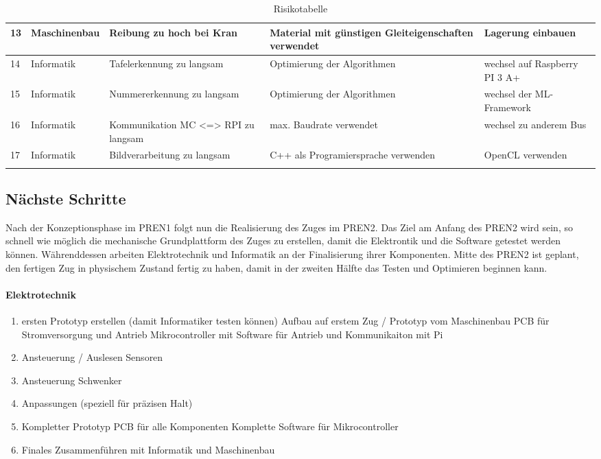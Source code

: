\documentclass[../../main.tex]{subfiles}
\begin{document}
\begin{longtable}{|l|p{2.5cm}|p{3cm}|p{3.8cm}|p{3.8cm}|}
    13  & Maschinenbau & Reibung zu hoch bei Kran                                   & Material mit günstigen Gleiteigenschaften verwendet & Lagerung einbauen \\ \hline
    14 & Informatik    & Tafelerkennung zu langsam                              & Optimierung der Algorithmen   & wechsel auf Raspberry PI 3 A+ \\ \hline
    15 & Informatik     & Nummererkennung zu langsam                            & Optimierung der Algorithmen   & wechsel der ML- Framework \\ \hline
    16 & Informatik     & Kommunikation MC <=> RPI zu langsam                   & max. Baudrate verwendet       & wechsel zu anderem Bus \\ \hline
    17 & Informatik     & Bildverarbeitung zu langsam                           & C++ als Programiersprache verwenden & OpenCL verwenden \\ \hline
    \caption{Risikotabelle}
    \end{longtable}


\subsection{Nächste Schritte}
Nach der Konzeptionsphase im PREN1 folgt nun die Realisierung des Zuges im PREN2. Das Ziel am Anfang des PREN2 wird sein, so schnell wie möglich die mechanische Grundplattform des Zuges zu erstellen, damit die Elektrontik und die Software getestet werden können. Währenddessen arbeiten Elektrotechnik und Informatik an der Finalisierung ihrer Komponenten. Mitte des PREN2 ist geplant, den fertigen Zug in physischem Zustand fertig zu haben, damit in der zweiten Hälfte das Testen und Optimieren beginnen kann.
\paragraph{Elektrotechnik}
\begin{enumerate}
    \item ersten Prototyp erstellen (damit Informatiker testen können)
        \subitem Aufbau auf erstem Zug / Prototyp vom Maschinenbau
        \subitem PCB für Stromversorgung und Antrieb
        \subitem Mikrocontroller mit Software für Antrieb und Kommunikaiton mit Pi
    \item Ansteuerung / Auslesen Sensoren
    \item Ansteuerung Schwenker
    \item Anpassungen (speziell für präzisen Halt)
    \item Kompletter Prototyp
        \subitem PCB für alle Komponenten
        \subitem Komplette Software für Mikrocontroller
    \item Finales Zusammenführen mit Informatik und Maschinenbau
\end{enumerate}
\end{document}
